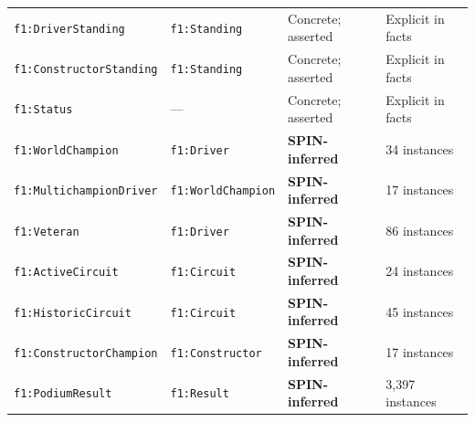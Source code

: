\begin{center}
\begin{tabularx}{\linewidth}{@{}lllX@{}}
\texttt{f1:DriverStanding}      & \texttt{f1:Standing}   & Concrete; asserted  & Explicit in facts \\
\texttt{f1:ConstructorStanding} & \texttt{f1:Standing}   & Concrete; asserted  & Explicit in facts \\
\texttt{f1:Status}              & —                      & Concrete; asserted  & Explicit in facts \\
\midrule
\texttt{f1:WorldChampion}       & \texttt{f1:Driver}     & \textbf{SPIN-inferred} & 34 instances \\
\texttt{f1:MultichampionDriver} & \texttt{f1:WorldChampion} & \textbf{SPIN-inferred} & 17 instances \\
\texttt{f1:Veteran}             & \texttt{f1:Driver}     & \textbf{SPIN-inferred} & 86 instances \\
\texttt{f1:ActiveCircuit}       & \texttt{f1:Circuit}    & \textbf{SPIN-inferred} & 24 instances \\
\texttt{f1:HistoricCircuit}     & \texttt{f1:Circuit}    & \textbf{SPIN-inferred} & 45 instances \\
\texttt{f1:ConstructorChampion} & \texttt{f1:Constructor}& \textbf{SPIN-inferred} & 17 instances \\
\texttt{f1:PodiumResult}        & \texttt{f1:Result}     & \textbf{SPIN-inferred} & 3{,}397 instances \\
\bottomrule
\end{tabularx}
\end{center}
